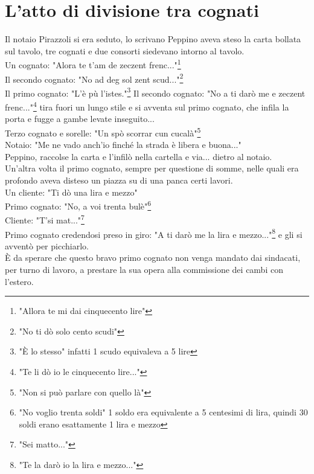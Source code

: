 
\chapter{L'atto di divisione tra cognati}
Il notaio Pirazzoli si era seduto, lo scrivano Peppino aveva steso la carta bollata sul tavolo, tre cognati e due consorti siedevano intorno al tavolo. \\
Un cognato: "Alora te t'am de zeczent frenc..."\footnote{"Allora te mi dai cinquecento lire"}\\
Il secondo cognato: "No ad deg sol zent scud..."\footnote{"No ti dò solo cento scudi"}\\
Il primo cognato: "L'è pù l'istes."\footnote{"È lo stesso" infatti 1 scudo equivaleva a 5 lire}
Il secondo cognato: "No a ti darò me e zeczent frenc..."\footnote{"Te li dò io le cinquecento lire..."} tira fuori un lungo stile e si avventa sul primo cognato, che infila la porta e fugge a gambe levate inseguito...\\
Terzo cognato e sorelle: "Un spò scorrar cun cucalà"\footnote{"Non si può parlare con quello là"}\\
Notaio: "Me ne vado anch'io finché la strada è libera e buona..."\\
Peppino, raccolse la carta e l'infilò nella cartella e via... dietro al notaio.\\
Un'altra volta il primo cognato, sempre per questione di somme, nelle quali era profondo aveva disteso un piazza su di una panca certi lavori.\\
Un cliente: "Ti dò una lira e mezzo"\\
Primo cognato: "No, a voi trenta bulè"\footnote{"No voglio trenta soldi" 1 soldo era equivalente a 5 centesimi di lira, quindi 30 soldi erano esattamente 1 lira e mezzo}\\
Cliente: "T'si mat..."\footnote{"Sei matto..."}\\
Primo cognato credendosi preso in giro: "A ti darò me la lira e mezzo..."\footnote{"Te la darò io la lira e mezzo..."} e gli si avventò per picchiarlo.\\
È da sperare che questo bravo primo cognato non venga mandato dai sindacati, per turno di lavoro, a prestare la sua opera alla commissione dei cambi con l'estero.\\

